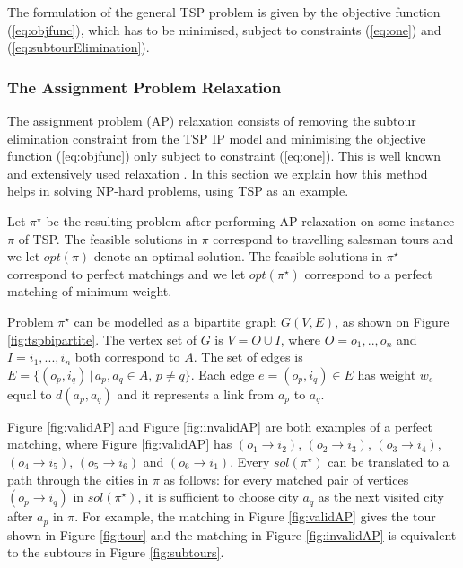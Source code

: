 \documentclass{mprop}
\theoremstyle{definition}
\begin{document}
The formulation of the general TSP problem is given by the objective function (\ref{eq:objfunc}), which has to be minimised, subject to constraints (\ref{eq:one}) and (\ref{eq:subtourElimination}).

\subsubsection{The Assignment Problem Relaxation}

The assignment problem (AP) relaxation consists of removing the subtour elimination constraint from the TSP IP model and minimising the objective function (\ref{eq:objfunc}) only subject to constraint (\ref{eq:one}). This is well known and extensively used relaxation \cite{Fischetti92,Jonker80,Eastman58,Laporte86}. In this section we explain how this method helps in solving NP-hard problems, using TSP as an example.

Let $\pi^{\star}$ be the resulting problem after performing AP relaxation on some instance $\pi$ of TSP. 
The feasible solutions in $\pi$ correspond to travelling salesman tours and we let $opt(\pi)$ denote an optimal solution. The feasible solutions in $\pi^{\star}$ correspond to perfect matchings and we let $opt(\pi^{\star})$ correspond to a perfect matching of minimum weight.

Problem $\pi^{\star}$ can be modelled as a bipartite graph $G(V,E)$, as shown on Figure \ref{fig:tspbipartite}. The vertex set of $G$ is $V=O \cup I$, where $O = o_{1},..,o_{n}$ and $I = i_{1},...,i_{n}$ both correspond to $A$. The set of edges is $E = \{(o_{p}, i_{q}) \,|\, a_{p},a_{q} \in A,\, p \neq q \}$. Each edge $e = (o_{p}, i_{q}) \in E$ has weight $w_{e}$ equal to $d(a_{p},a_{q})$ and it represents a link from $a_{p}$ to $a_{q}$.

Figure \ref{fig:validAP} and Figure \ref{fig:invalidAP} are both examples of a perfect matching, where Figure \ref{fig:validAP} has $(o_{1} \rightarrow i_{2})$, $(o_{2} \rightarrow i_{3})$, $(o_{3} \rightarrow i_{4})$, $(o_{4} \rightarrow i_{5})$, $(o_{5} \rightarrow i_{6})$ and $(o_{6} \rightarrow i_{1})$.
Every $sol(\pi^{\star})$ can be translated to a path through the cities in $\pi$ as follows: for every matched pair of vertices $(o_{p} \rightarrow i_{q})$ in $sol(\pi^{\star})$, it is sufficient to choose city $a_{q}$ as the next visited city after $a_{p}$ in $\pi$. For example, the matching in Figure \ref{fig:validAP} gives the tour shown in Figure \ref{fig:tour} and the matching in Figure \ref{fig:invalidAP} is equivalent to the subtours in Figure \ref{fig:subtours}.
\end{document}
